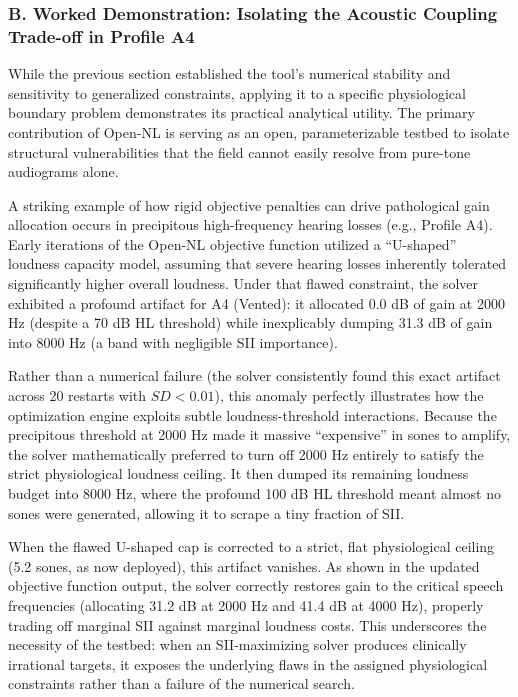 \documentclass[
  12pt,
]{article}
\begin{document}
\subsubsection{B. Worked Demonstration: Isolating the Acoustic Coupling
Trade-off in Profile
A4}\label{b.-worked-demonstration-isolating-the-acoustic-coupling-trade-off-in-profile-a4}

While the previous section established the tool's numerical stability
and sensitivity to generalized constraints, applying it to a specific
physiological boundary problem demonstrates its practical analytical
utility. The primary contribution of Open-NL is serving as an open,
parameterizable testbed to isolate structural vulnerabilities that the
field cannot easily resolve from pure-tone audiograms alone.

A striking example of how rigid objective penalties can drive
pathological gain allocation occurs in precipitous high-frequency
hearing losses (e.g., Profile A4). Early iterations of the Open-NL
objective function utilized a ``U-shaped'' loudness capacity model,
assuming that severe hearing losses inherently tolerated significantly
higher overall loudness. Under that flawed constraint, the solver
exhibited a profound artifact for A4 (Vented): it allocated 0.0 dB of
gain at 2000 Hz (despite a 70 dB HL threshold) while inexplicably
dumping 31.3 dB of gain into 8000 Hz (a band with negligible SII
importance).

Rather than a numerical failure (the solver consistently found this
exact artifact across 20 restarts with \(SD < 0.01\)), this anomaly
perfectly illustrates how the optimization engine exploits subtle
loudness-threshold interactions. Because the precipitous threshold at
2000 Hz made it massive ``expensive'' in sones to amplify, the solver
mathematically preferred to turn off 2000 Hz entirely to satisfy the
strict physiological loudness ceiling. It then dumped its remaining
loudness budget into 8000 Hz, where the profound 100 dB HL threshold
meant almost no sones were generated, allowing it to scrape a tiny
fraction of SII.

When the flawed U-shaped cap is corrected to a strict, flat
physiological ceiling (5.2 sones, as now deployed), this artifact
vanishes. As shown in the updated objective function output, the solver
correctly restores gain to the critical speech frequencies (allocating
31.2 dB at 2000 Hz and 41.4 dB at 4000 Hz), properly trading off
marginal SII against marginal loudness costs. This underscores the
necessity of the testbed: when an SII-maximizing solver produces
clinically irrational targets, it exposes the underlying flaws in the
assigned physiological constraints rather than a failure of the
numerical search.
\end{document}
